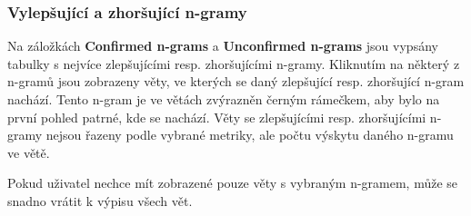 \subsubsection{Vylepšující a zhoršující n-gramy}
Na záložkách \textbf{Confirmed n-grams} a \textbf{Unconfirmed n-grams} jsou vypsány tabulky s nejvíce zlepšujícími resp. zhoršujícími n-gramy.
Kliknutím na některý z n-gramů jsou zobrazeny věty,
  ve kterých se daný zlepšující resp. zhoršující n-gram nachází.
Tento n-gram je ve větách zvýrazněn černým rámečkem,
  aby bylo na první pohled patrné,
  kde se nachází.
Věty se zlepšujícími resp. zhoršujícími n-gramy nejsou řazeny podle vybrané metriky,
  ale počtu výskytu daného n-gramu ve větě.

Pokud uživatel nechce mít zobrazené pouze věty s vybraným n-gramem,
  může se snadno vrátit k výpisu všech vět.



